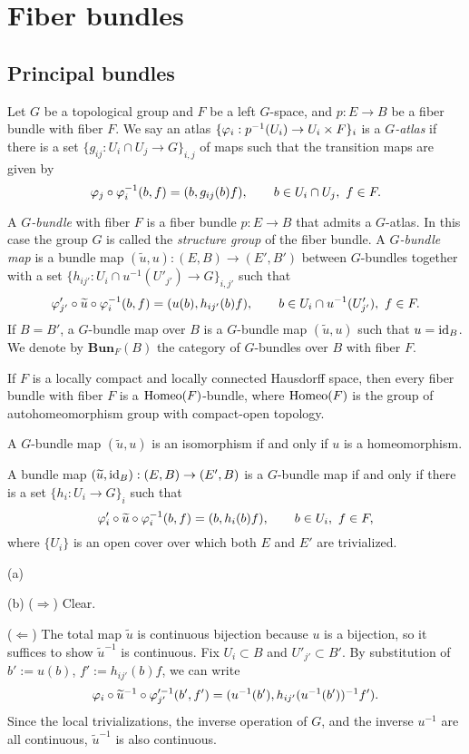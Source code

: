 \documentclass{../../large}
\begin{document}
\chapter{Fiber bundles}


\section{Principal bundles}

\begin{prb}
Let $G$ be a topological group and $F$ be a left $G$-space, and $p:E\to B$ be a fiber bundle with fiber $F$.
We say an atlas $\{\varphi_i:p^{-1}(U_i)\to U_i\times F\}_i$ is a \emph{$G$-atlas} if there is a set $\{g_{ij}:U_i\cap U_j\to G\}_{i,j}$ of maps such that the transition maps are given by
\[\varphi_j\circ\varphi_i^{-1}(b,f)=(b,g_{ij}(b)f),
\qquad b\in U_i\cap U_j,\ f\in F.\]

A \emph{$G$-bundle} with fiber $F$ is a fiber bundle $p:E\to B$ that admits a $G$-atlas.
In this case the group $G$ is called the \emph{structure group} of the fiber bundle.
A \emph{$G$-bundle map} is a bundle map $(\tilde u,u):(E,B)\to(E',B')$ between $G$-bundles together with a set $\{h_{ij'}:U_i\cap u^{-1}(U'_{j'})\to G\}_{i,j'}$ such that
\[\varphi'_{j'}\circ\widetilde u\circ \varphi_i^{-1}(b,f)=(u(b),h_{ij'}(b)f),
\qquad b\in U_i\cap u^{-1}(U'_{j'}),\ f\in F.\]
If $B=B'$, a $G$-bundle map over $B$ is a $G$-bundle map $(\tilde u,u)$ such that $u=\operatorname{id}_B$.
We denote by $\mathbf{Bun}_F(B)$ the category of $G$-bundles over $B$ with fiber $F$.
\begin{parts}
\item If $F$ is a locally compact and locally connected Hausdorff space, then every fiber bundle with fiber $F$ is a $\operatorname{Homeo}(F)$-bundle, where $\operatorname{Homeo}(F)$ is the group of autohomeomorphism group with compact-open topology.
\item A $G$-bundle map $(\tilde u,u)$ is an isomorphism if and only if $u$ is a homeomorphism.
\item A bundle map $(\widetilde u,\operatorname{id}_B):(E,B)\to(E',B)$ is a $G$-bundle map if and only if there is a set $\{h_i:U_i\to G\}_i$ such that
\[\varphi_i'\circ\widetilde u\circ\varphi_i^{-1}(b,f)=(b,h_i(b)f),
\qquad b\in U_i,\ f\in F,\]
where $\{U_i\}$ is an open cover over which both $E$ and $E'$ are trivialized.
\end{parts}
\end{prb}
\begin{pf}
(a)

(b)
($\Rightarrow$)
Clear.

($\Leftarrow$)
The total map $\tilde u$ is continuous bijection because $u$ is a bijection, so it suffices to show $\tilde u^{-1}$ is continuous.
Fix $U_i\subset B$ and $U'_{j'}\subset B'$.
By substitution of $b':=u(b)$, $f':=h_{ij'}(b)f$, we can write
\[\varphi_i\circ\widetilde u^{-1}\circ\varphi_{j'}'^{-1}(b',f')=(u^{-1}(b'),h_{ij'}(u^{-1}(b'))^{-1}f').\]
Since the local trivializations, the inverse operation of $G$, and the inverse $u^{-1}$ are all continuous, $\tilde u^{-1}$ is also continuous.
\end{pf}
\end{document}

